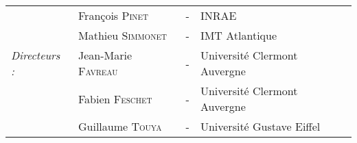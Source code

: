 \begin{titlepage}
\begin{center}
\begin{tabular}{llcl}
                              & François \textsc{Pinet}		& - & INRAE \\
                        	& Mathieu \textsc{Simmonet}		& - & IMT Atlantique \\
      \textit{Directeurs :}	& Jean-Marie \textsc{Favreau}		& - & Université Clermont Auvergne \\
                              & Fabien \textsc{Feschet}		& - & Université Clermont Auvergne\\
                              & Guillaume \textsc{Touya}		& - & Université Gustave Eiffel \\
\end{tabular}
\end{center}
\end{titlepage}

\sloppy

\titlepage

